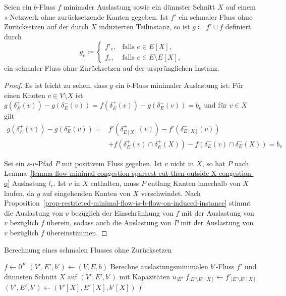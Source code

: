 \begin{corollary}\label{cor-thin-flow-alg-correct}
	Seien ein $b$-Fluss $f$ minimaler Auslastung sowie ein dünnster Schnitt $X$ auf einem $s$-Netzwerk ohne zurücksetzende Kanten gegeben.
	Ist $f'$ ein schmaler Fluss ohne Zurücksetzen auf der durch $X$ induzierten Teilinstanz, so ist $g \coloneq f' \sqcup f$ definiert durch \[
		g_e \coloneq \begin{cases}
			f'_e, & \text{falls $e\in E[X]$,} \\
			f_e, & \text{falls $e\in E\setminus E[X]$,}
		\end{cases}
	\] ein schmaler Fluss ohne Zurücksetzen auf der ursprünglichen Instanz.
\end{corollary}
\begin{proof}
	Es ist leicht zu sehen, dass $g$ ein $b$-Fluss minimaler Auslastung ist:
	Für einen Knoten $v \in V\setminus X$ ist $g(\delta^+_E(v)) - g(\delta^-_E(v)) = f(\delta^+_E(v)) - g(\delta^-_E(v)) = b_v$ und für $v\in X$ gilt
	\begin{align*}
	g(\delta^+_E(v)) - g(\delta^-_E(v)) =& f'(\delta^+_{E[X]}(v)) - f'(\delta^-_{E[X]}(v)) \\
	&+ f(\delta^+_E(v)\cap\delta^+_E(X)) - f(\delta^-_E(v)\cap\delta^-_E(X)) = b_v
	\end{align*}

	Sei ein $s$-$v$-Pfad $P$ mit positivem Fluss gegeben.
	Ist $v$ nicht in $X$, so hat $P$ nach Lemma~\ref{lemma-flow-minimal-congestion-sparsest-cut-then-outside-X-congestion-q} Auslastung $l_v$.
	Ist $v$ in $X$ enthalten, muss $P$ entlang Kanten innerhalb von $X$ laufen, da $g$ auf eingehenden Kanten von $X$ verschwindet.
	Nach Proposition~\ref{prop-restricted-minimal-flow-is-b-flow-on-induced-instance} stimmt die Auslastung von $v$ bezüglich der Einschränkung von $f$ mit der Auslastung von $v$ bezüglich $f$ überein, sodass auch die Auslastung von $P$ mit der Auslastung von $v$ bezüglich $f$ übereinstimmen.
\end{proof}

\begin{algorithm}
\caption{Berechnung eines schmalen Flusses ohne Zurücksetzen}
\label{algorithm-computation-thin-flow-without-resetting}
\begin{algorithmic}[1]
	\State $f \gets 0^E$
	\State $(V', E', b') \gets (V, E, b)$
	\State Berechne auslastungsminimalen $b'$-Fluss $f'$ und dünnsten Schnitt $X$
	\Statex auf $(V', E', b')$ mit Kapazitäten $u_{\mid E'}$
	\State $f_{\mid E'\setminus E'[X]} \gets f'_{\mid E'\setminus E'[X]}$
	\State $(V', E', b') \gets (V'[X], E'[X], b'[X])$
	\EndWhile
	\State\Return $f$
	\EndProcedure
\end{algorithmic}
\end{algorithm}

